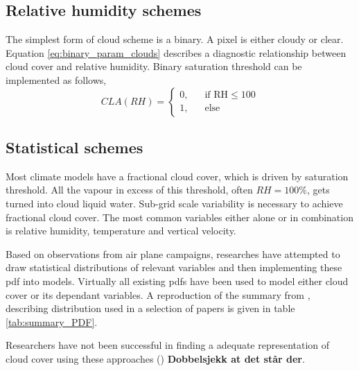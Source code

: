

\subsection{Relative humidity schemes}
The simplest form of cloud scheme is a binary. A pixel is either cloudy or clear. Equation \eqref{eq:binary_param_clouds} describes a diagnostic relationship between cloud cover and relative humidity. Binary saturation threshold can be implemented as follows,
\begin{equation} \label{eq:binary_param_clouds}
    CLA\left(RH\right) = 
     \begin{cases}
       \text{0,} &\quad\text{if RH}\le100\\
       \text{1,} &\quad\text{else}
     \end{cases}
\end{equation}

\subsection{Statistical schemes}
Most climate models have a fractional cloud cover, which is driven by saturation threshold. All the vapour in excess of this threshold, often $RH=100\%$, gets turned into cloud liquid water. Sub-grid scale variability is necessary to achieve fractional cloud cover. The most common variables either alone or in combination is relative humidity, temperature and vertical velocity. 

Based on observations from air plane campaigns, researches have attempted to draw statistical distributions of relevant variables and then implementing these \acrshort{pdf} into models. Virtually all existing \acrshort{pdf}s have been used to model either cloud cover or its dependant variables. %
A reproduction of the summary from \cite{Tompkins2009CloudParametrization}, describing distribution used in a selection of papers is given in table \ref{tab:summary_PDF}.

Researchers have not been successful in finding a adequate representation of cloud cover using these approaches (\cite{Tompkins2009CloudParametrization}) \textbf{Dobbelsjekk at det står der}. 

